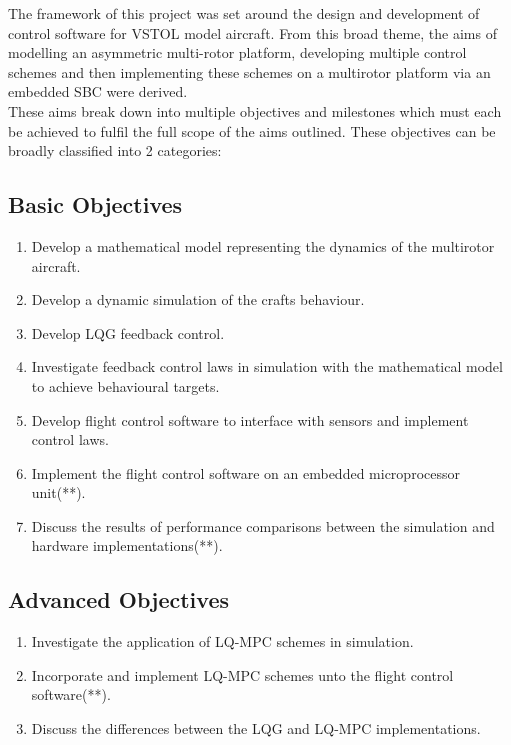 \documentclass[12pt,a4paper,twoside]{report}
\begin{document}
			The framework of this project was set around the design and development of control software for VSTOL model aircraft. From this broad theme, the aims of modelling an asymmetric multi-rotor platform, developing multiple control schemes and then implementing these schemes on a multirotor platform via an embedded SBC were derived.
			\\
			These aims break down into multiple objectives and milestones which must each be achieved to fulfil the full scope of the aims outlined. These objectives can be broadly classified into 2 categories: 
	
				\subsection*{Basic Objectives}
				
					\begin{enumerate}
						\item
							Develop a mathematical model representing the dynamics of the multirotor aircraft.
						\item
							Develop a dynamic simulation of the crafts behaviour.
						\item
							Develop LQG feedback control.
						\item
							Investigate feedback control laws in simulation with the mathematical model to achieve behavioural targets.
						\item
							Develop flight control software to interface with sensors and implement control laws.
						\item
							Implement the flight control software on an embedded microprocessor unit(**).
						\item
							Discuss the results of performance comparisons between the simulation and hardware implementations(**).
					\end{enumerate}
				
				\subsection*{Advanced Objectives}
				
					\begin{enumerate}
						\item
							Investigate the application of LQ-MPC schemes in simulation.
						\item	
							Incorporate and implement LQ-MPC schemes unto the flight control software(**).
						\item	
							Discuss the differences between the LQG and LQ-MPC implementations.
					\end{enumerate}
				
\end{document}

